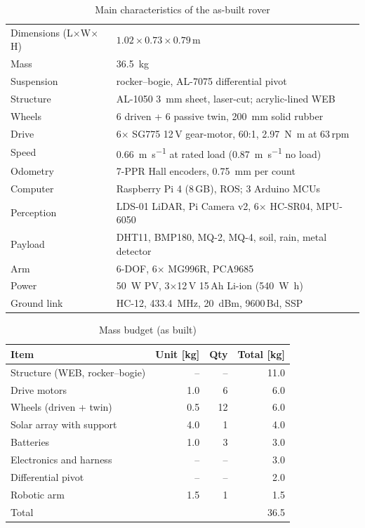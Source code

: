\documentclass[conference]{IEEEtran}
\begin{document}
\begin{table}[t]
\centering
\caption{Main characteristics of the as-built rover}
\label{tab:specs}
\footnotesize
\begin{tabular}{@{}p{1.85cm}p{6.45cm}@{}}
\toprule
Dimensions (L$\times$W$\times$H) & $1.02\times0.73\times0.79$\,m \\
Mass & \SI{36.5}{\kilo\gram} \\
Suspension & rocker--bogie, AL-7075 differential pivot \\
Structure & AL-1050 \SI{3}{\milli\metre} sheet, laser-cut; acrylic-lined WEB \\
Wheels & 6 driven + 6 passive twin, \SI{200}{\milli\metre} solid rubber \\
Drive & 6$\times$ SG775 12\,V gear-motor, 60:1, \SI{2.97}{\newton\metre} at 63\,rpm \\
Speed & \SI{0.66}{\metre\per\second} at rated load (\SI{0.87}{\metre\per\second} no load) \\
Odometry & 7-PPR Hall encoders, \SI{0.75}{\milli\metre} per count \\
Computer & Raspberry Pi 4 (8\,GB), ROS; 3 Arduino MCUs \\
Perception & LDS-01 LiDAR, Pi Camera v2, 6$\times$ HC-SR04, MPU-6050 \\
Payload & DHT11, BMP180, MQ-2, MQ-4, soil, rain, metal detector \\
Arm & 6-DOF, 6$\times$ MG996R, PCA9685 \\
Power & \SI{50}{\watt} PV, 3$\times$12\,V 15\,Ah Li-ion (\SI{540}{\watt\hour}) \\
Ground link & HC-12, \SI{433.4}{\mega\hertz}, \SI{20}{dBm}, 9600\,Bd, SSP \\
\bottomrule
\end{tabular}
\end{table}

\begin{table}[t]
\centering
\caption{Mass budget (as built)}
\label{tab:mass}
\footnotesize
\begin{tabular}{@{}lrrr@{}}
\toprule
Item & Unit [kg] & Qty & Total [kg] \\
\midrule
Structure (WEB, rocker--bogie) & -- & -- & 11.0 \\
Drive motors & 1.0 & 6 & 6.0 \\
Wheels (driven + twin) & 0.5 & 12 & 6.0 \\
Solar array with support & 4.0 & 1 & 4.0 \\
Batteries & 1.0 & 3 & 3.0 \\
Electronics and harness & -- & -- & 3.0 \\
Differential pivot & -- & -- & 2.0 \\
Robotic arm & 1.5 & 1 & 1.5 \\
\midrule
Total & & & 36.5 \\
\bottomrule
\end{tabular}
\end{table}
\end{document}
